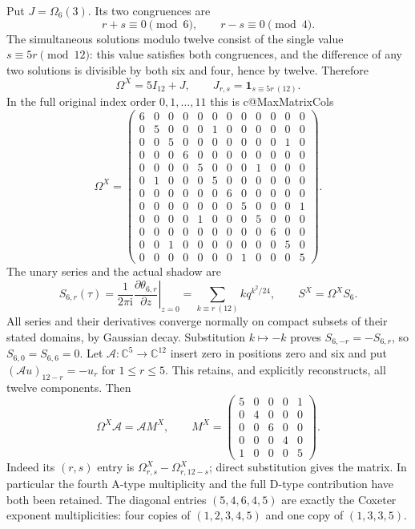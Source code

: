 Put $J=\Omega_6(3)$.  Its two congruences are
\[
 r+s\equiv0\pmod6,\qquad r-s\equiv0\pmod4.
\]
The simultaneous solutions modulo twelve consist of the single value
$s\equiv5r\pmod{12}$: this value satisfies both congruences, and the
difference of any two solutions is divisible by both six and four, hence
by twelve.  Therefore
\[
 \boxed{\Omega^X=5I_{12}+J,\qquad J_{r,s}=\mathbf1_{s\equiv5r\ (12)}.}
\]
In the full original index order $0,1,\ldots,11$ this is
\begingroup
\csname c@MaxMatrixCols\relax
\[
\Omega^X=\begin{pmatrix}
6&0&0&0&0&0&0&0&0&0&0&0\\
0&5&0&0&0&1&0&0&0&0&0&0\\
0&0&5&0&0&0&0&0&0&0&1&0\\
0&0&0&6&0&0&0&0&0&0&0&0\\
0&0&0&0&5&0&0&0&1&0&0&0\\
0&1&0&0&0&5&0&0&0&0&0&0\\
0&0&0&0&0&0&6&0&0&0&0&0\\
0&0&0&0&0&0&0&5&0&0&0&1\\
0&0&0&0&1&0&0&0&5&0&0&0\\
0&0&0&0&0&0&0&0&0&6&0&0\\
0&0&1&0&0&0&0&0&0&0&5&0\\
0&0&0&0&0&0&0&1&0&0&0&5
\end{pmatrix}.
\]
\endgroup
The unary series and the actual shadow are
\[
 S_{6,r}(\tau)=\frac1{2\pi\mathrm i}
  \left.\frac{\partial\theta_{6,r}}{\partial z}\right|_{z=0}
 =\sum_{k\equiv r\ (12)}kq^{k^2/24},
 \qquad S^X=\Omega^X S_6.
\]
All series and their derivatives converge normally on compact subsets of
their stated domains, by Gaussian decay.  Substitution $k\mapsto-k$
proves $S_{6,-r}=-S_{6,r}$, so $S_{6,0}=S_{6,6}=0$.
Let $\mathcal A:\mathbb C^5\to\mathbb C^{12}$ insert zero in positions
zero and six and put $(\mathcal Au)_{12-r}=-u_r$ for $1\le r\le5$.
This retains, and explicitly reconstructs, all twelve components.  Then
\[
 \Omega^X\mathcal A=\mathcal A M^X,\qquad
 \boxed{M^X=\begin{pmatrix}
 5&0&0&0&1\\0&4&0&0&0\\0&0&6&0&0\\
 0&0&0&4&0\\1&0&0&0&5
 \end{pmatrix}.}
\]
Indeed its $(r,s)$ entry is
$\Omega^X_{r,s}-\Omega^X_{r,12-s}$; direct substitution gives the matrix.
In particular the fourth A-type multiplicity and the full D-type
contribution have both been retained.  The diagonal entries
$(5,4,6,4,5)$ are exactly the Coxeter exponent multiplicities:
four copies of $(1,2,3,4,5)$ and one copy of $(1,3,3,5)$.

